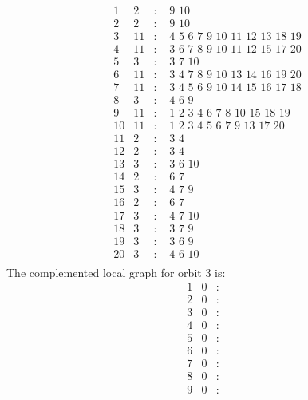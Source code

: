 \documentclass[12pt]{article}
\begin{document}
\begin{equation*}
\begin{array}{rrcl}
1&2&:&\,\,9\,\,10\\
2&2&:&\,\,9\,\,10\\
3&11&:&\,\,4\,\,5\,\,6\,\,7\,\,9\,\,10\,\,11\,\,12\,\,13\,\,18\,\,19\\
4&11&:&\,\,3\,\,6\,\,7\,\,8\,\,9\,\,10\,\,11\,\,12\,\,15\,\,17\,\,20\\
5&3&:&\,\,3\,\,7\,\,10\\
6&11&:&\,\,3\,\,4\,\,7\,\,8\,\,9\,\,10\,\,13\,\,14\,\,16\,\,19\,\,20\\
7&11&:&\,\,3\,\,4\,\,5\,\,6\,\,9\,\,10\,\,14\,\,15\,\,16\,\,17\,\,18\\
8&3&:&\,\,4\,\,6\,\,9\\
9&11&:&\,\,1\,\,2\,\,3\,\,4\,\,6\,\,7\,\,8\,\,10\,\,15\,\,18\,\,19\\
10&11&:&\,\,1\,\,2\,\,3\,\,4\,\,5\,\,6\,\,7\,\,9\,\,13\,\,17\,\,20\\
11&2&:&\,\,3\,\,4\\
12&2&:&\,\,3\,\,4\\
13&3&:&\,\,3\,\,6\,\,10\\
14&2&:&\,\,6\,\,7\\
15&3&:&\,\,4\,\,7\,\,9\\
16&2&:&\,\,6\,\,7\\
17&3&:&\,\,4\,\,7\,\,10\\
18&3&:&\,\,3\,\,7\,\,9\\
19&3&:&\,\,3\,\,6\,\,9\\
20&3&:&\,\,4\,\,6\,\,10\\
\end{array}
\end{equation*}
The complemented local graph for orbit $3$ is:
\begin{equation*}
\begin{array}{rrcl}
1&0&:&\\
2&0&:&\\
3&0&:&\\
4&0&:&\\
5&0&:&\\
6&0&:&\\
7&0&:&\\
8&0&:&\\
9&0&:&\\
\end{array}
\end{equation*}
\end{document}
